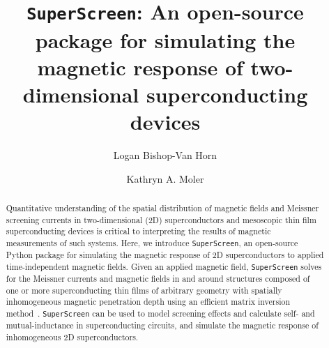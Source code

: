 \documentclass[final,3p,times,twocolumn]{elsarticle}
\newcommand{\inline}[1]{\texttt{#1}\xspace}
\newcommand{\SuperScreen}{\inline{SuperScreen}}
\begin{document}
\begin{frontmatter}



\title{\texttt{SuperScreen}: An open-source package for simulating the magnetic response of two-dimensional superconducting devices}


\author[PHYS,SIMES]{Logan Bishop-Van Horn}
\author[AP,SIMES,GLAM]{Kathryn A. Moler}


\address[PHYS]{Department of Physics, Stanford University, Stanford, California 94305, USA}
\address[AP]{Department of Applied Physics, Stanford University, Stanford, California 94305, USA}
\address[SIMES]{Stanford Institute for Materials and Energy Sciences, SLAC National Accelerator Laboratory, 2575 Sand Hill Road, Menlo Park, California 94025, USA}
\address[GLAM]{Geballe Laboratory for Advanced Materials, Stanford University, Stanford, California 94305, USA}

\begin{abstract}
Quantitative understanding of the spatial distribution of magnetic fields and Meissner screening currents in two-dimensional (2D) superconductors and mesoscopic thin film superconducting devices is critical to interpreting the results of magnetic measurements of such systems. Here, we introduce \SuperScreen, an open-source Python package for simulating the magnetic response of 2D superconductors to applied time-independent magnetic fields. Given an applied magnetic field, \SuperScreen solves for the Meissner currents and magnetic fields in and around structures composed of one or more superconducting thin films of arbitrary geometry with spatially inhomogeneous magnetic penetration depth using an efficient matrix inversion method~\cite{Brandt2004-ew, Brandt2005-wj}. \SuperScreen can be used to model screening effects and calculate self- and mutual-inductance in superconducting circuits, and simulate the magnetic response of inhomogeneous 2D superconductors.
\end{abstract}


\end{frontmatter}
\end{document}
